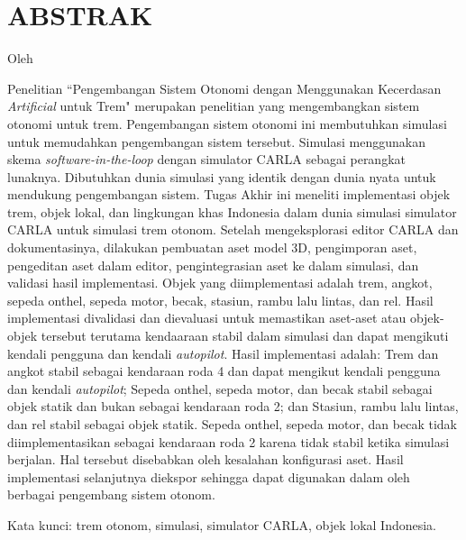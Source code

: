\chapter*{ABSTRAK}

\begin{center}
	\center
	\begin{onehalfspace}
		\Large \bfseries \MakeUppercase{\thetitle}

		\normalfont \normalsize
		Oleh

		\theauthor
	\end{onehalfspace}
\end{center}

\begin{singlespace}
	Penelitian ``Pengembangan Sistem Otonomi dengan Menggunakan Kecerdasan
	\textit{Artificial} untuk Trem"  merupakan penelitian yang mengembangkan
	sistem otonomi untuk trem. Pengembangan sistem otonomi ini membutuhkan
	simulasi untuk memudahkan pengembangan sistem tersebut. Simulasi menggunakan
	skema \textit{software-in-the-loop} dengan simulator CARLA sebagai perangkat
	lunaknya. Dibutuhkan dunia simulasi yang identik dengan dunia nyata untuk
	mendukung pengembangan sistem. Tugas Akhir ini meneliti implementasi objek
	trem, objek lokal, dan lingkungan khas Indonesia dalam dunia simulasi
	simulator CARLA untuk simulasi trem otonom. Setelah mengeksplorasi editor
	CARLA dan dokumentasinya, dilakukan pembuatan aset model 3D, pengimporan
	aset, pengeditan aset dalam editor, pengintegrasian aset ke dalam simulasi,
	dan validasi hasil implementasi. Objek yang diimplementasi adalah trem,
	angkot, sepeda onthel, sepeda motor, becak, stasiun, rambu lalu lintas, dan
	rel. Hasil implementasi divalidasi dan dievaluasi untuk memastikan aset-aset
	atau objek-objek tersebut terutama kendaaraan stabil dalam simulasi dan
	dapat mengikuti kendali pengguna dan kendali \textit{autopilot}. Hasil
	implementasi adalah: Trem dan angkot stabil sebagai kendaraan roda 4 dan
	dapat mengikut kendali pengguna dan kendali \textit{autopilot}; Sepeda
	onthel, sepeda motor, dan becak stabil sebagai objek statik dan bukan
	sebagai kendaraan roda 2; dan Stasiun, rambu lalu lintas, dan rel stabil
	sebagai objek statik. Sepeda onthel, sepeda motor, dan becak tidak
	diimplementasikan sebagai kendaraan roda 2 karena tidak stabil ketika
	simulasi berjalan. Hal tersebut disebabkan oleh kesalahan konfigurasi aset.
	Hasil implementasi selanjutnya diekspor sehingga dapat digunakan dalam oleh
	berbagai pengembang sistem otonom.

	Kata kunci: trem otonom, simulasi, simulator CARLA, objek lokal Indonesia.
\end{singlespace}

\clearpage
